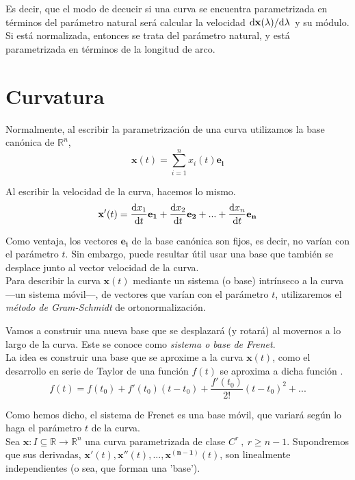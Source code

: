 Es decir, que el modo de decucir si una curva se encuentra parametrizada en términos del parámetro natural será calcular la velocidad $\dv*{\mathbf{x}(\lambda)}{\lambda}$ y su módulo. Si está normalizada, entonces se trata del parámetro natural, y está parametrizada en términos de la longitud de arco.

\section{Curvatura}

Normalmente, al escribir la parametrización de una curva utilizamos la base canónica de $\mathbb{R}^n$,
$$
\mathbf{x}(t)=\sum_{i=1}^n x_i(t)\mathbf{e_i}
$$

Al escribir la velocidad de la curva, hacemos lo mismo.
$$
\mathbf{x'}(t)=\dv{x_1}{t}\mathbf{e_1}+\dv{x_2}{t}\mathbf{e_2}+...+\dv{x_n}{t}\mathbf{e_n}
$$

Como ventaja, los vectores $\mathbf{e_i}$ de la base canónica son fijos, es decir, no varían con el parámetro $t$. Sin embargo, puede resultar útil usar una base que también se desplace junto al vector velocidad de la curva.\\%

Para describir la curva $\mathbf{x}(t)$ mediante un sistema (o base) intrínseco a la curva---un sistema móvil---, de vectores que varían con el parámetro $t$, utilizaremos el \emph{método de Gram-Schmidt} de ortonormalización.

Vamos a construir una nueva base que se desplazará (y rotará) al movernos a lo largo de la curva. Este se conoce como \emph{sistema o base de Frenet}.\\

La idea es construir una base que se aproxime a la curva $\mathbf{x}(t)$, como el desarrollo en serie de Taylor de una función $f(t)$ se aproxima a dicha función .
$$
f(t)=f(t_0)+f'(t_0)(t-t_0)+\frac{f'(t_0)}{2!}(t-t_0)^2+...
$$


Como hemos dicho, el sistema de Frenet es una base móvil, que variará según lo haga el parámetro $t$ de la curva.\\

Sea $\mathbf{x}:I\subseteq \mathbb{R}\longrightarrow \mathbb{R}^n$ una curva parametrizada de clase $C^r \ , \ r\ge n-1$. Supondremos que sus derivadas, $\mathbf{x'}(t), \mathbf{x''}(t),...,\mathbf{x^{(n-1)}}(t)$, son linealmente independientes (o sea, que forman una 'base'). %

